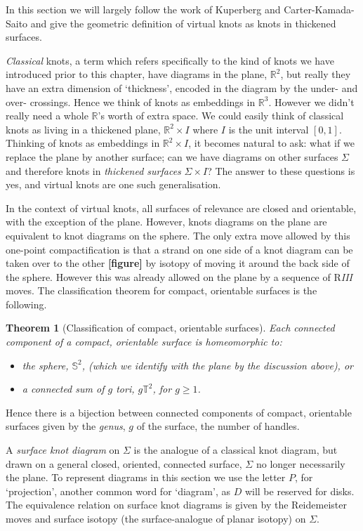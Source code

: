 \documentclass[12pt]{report}
\newcommand{\R}{\mathbb{R}}
\newcommand{\T}{\mathbb{T}}
\renewcommand{\S}{\mathbb{S}}
\newcommand{\notered}[1]{{\color{Red} \textbf{#1}}}
\newtheorem*{theorem}{Theorem}
\begin{document}
In this section we will largely follow the work of Kuperberg \cite{what-is-a-virtual-link} and Carter-Kamada-Saito \cite{stable-equivalence-virtual-cobordisms} and give the geometric definition of virtual knots as knots in thickened surfaces.

\textit{Classical} knots, a term which refers specifically to the kind of knots we have introduced prior to this chapter, have diagrams in the plane, $\R^{2}$, but really they have an extra dimension of `thickness', encoded in the diagram by the under- and over- crossings. Hence we think of knots as embeddings in $\R^{3}$. However we didn't really need a whole $\R$'s worth of extra space. We could easily think of classical knots as living in a thickened plane, $\R^{2} \times I$ where $I$ is the unit interval $[0, 1]$. Thinking of knots as embeddings in $\R^{2} \times I$, it becomes natural to ask: what if we replace the plane by another surface; can we have diagrams on other surfaces $\Sigma$ and therefore knots in \textit{thickened surfaces} $\Sigma \times I$? The answer to these questions is yes, and virtual knots are one such generalisation.

In the context of virtual knots, all surfaces of relevance are closed and orientable, with the exception of the plane. However, knots diagrams on the plane are equivalent to knot diagrams on the sphere. The only extra move allowed by this one-point compactification is that a strand on one side of a knot diagram can be taken over to the other \notered{[figure]} by isotopy of moving it around the back side of the sphere. However this was already allowed on the plane by a sequence of R\textit{III} moves.  The classification theorem for compact, orientable surfaces is the following.

\begin{theorem}[Classification of compact, orientable surfaces]
Each connected component of a compact, orientable surface is homeomorphic to:
\begin{itemize}
	\item the sphere, $\S^{2}$, (which we identify with the plane by the discussion above), or
	\item a connected sum of $g$ tori, $g\T^{2}$, for $g \geq 1$.
\end{itemize}
\end{theorem}
Hence there is a bijection between connected components of compact, orientable surfaces given by the \textit{genus}, $g$ of the surface, the number of handles.

A \textit{surface knot diagram} on $\Sigma$ is the analogue of a classical knot diagram, but drawn on a general closed, oriented, connected surface, $\Sigma$ no longer necessarily the plane. To represent diagrams in this section we use the letter $P$, for `projection', another common word for `diagram', as $D$ will be reserved for disks. The equivalence relation on surface knot diagrams is given by the Reidemeister moves and surface isotopy (the surface-analogue of planar isotopy) on $\Sigma$.
\end{document}
